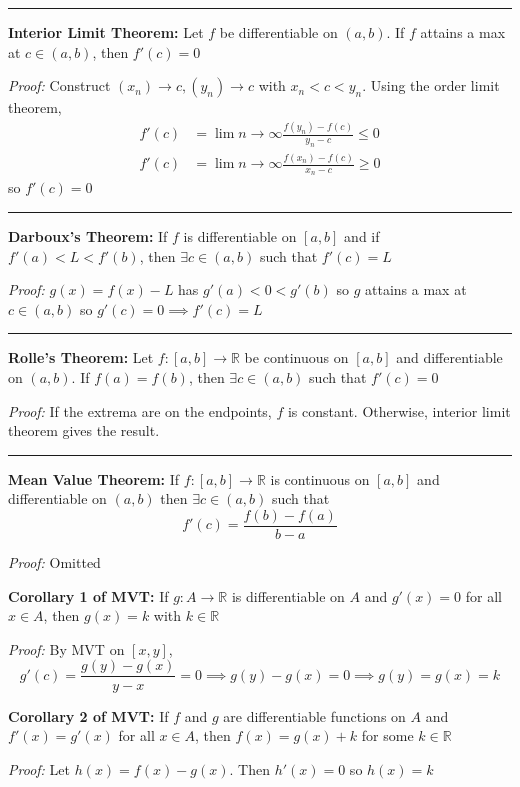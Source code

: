 \documentclass[12pt]{article}
\newcommand{\R}{\mathbb{R}}
\renewcommand{\hline}{\vspace*{10pt} \hrule \vspace*{10pt}}
\begin{document}
    \hline 

    \textbf{Interior Limit Theorem:} Let $f$ be differentiable on $(a, b)$. If $f$ attains a max at $c \in (a, b)$, then $f'(c) = 0$

        \emph{Proof:} Construct $(x_n) \to c, (y_n) \to c$ with $x_n < c < y_n$. Using the order limit theorem,
        \begin{align*}
            f'(c) &= \lim{n \to \infty} \frac{f(y_n) - f(c)}{y_n - c} \leq 0\\ 
            f'(c) &= \lim{n \to \infty} \frac{f(x_n) - f(c)}{x_n - c} \geq 0
        \end{align*}
        so $f'(c) = 0$ 

    \hline 

    \textbf{Darboux's Theorem:} If $f$ is differentiable on $[a, b]$ and if $f'(a) < L < f'(b)$, then $\exists c \in (a, b)$ such that $f'(c) = L$

        \emph{Proof:} $g(x) = f(x) - L$ has $g'(a) < 0 < g'(b)$ so $g$ attains a max at $c \in (a, b)$ so $g'(c) = 0 \implies f'(c) = L$

    \hline

    \textbf{Rolle's Theorem:} Let $f: [a, b] \to \R$ be continuous on $[a, b]$ and differentiable on $(a, b)$. If $f(a) = f(b)$, then $\exists c \in (a, b)$ such that $f'(c) = 0$

        \emph{Proof:} If the extrema are on the endpoints, $f$ is constant. Otherwise, interior limit theorem gives the result. 

    \hline 

    \textbf{Mean Value Theorem:} If $f: [a, b] \to \R$ is continuous on $[a, b]$ and differentiable on $(a, b)$ then $\exists c \in (a, b)$ such that
    \[f'(c) = \frac{f(b) - f(a)}{b - a}\]

        \emph{Proof:} Omitted 


    \textbf{Corollary 1 of MVT:} If $g: A \to \R$ is differentiable on $A$ and $g'(x) = 0$ for all $x \in A$, then $g(x) = k$ with $k \in \R$

        \emph{Proof:} By MVT on $[x, y]$, 
        \[g'(c) = \frac{g(y) - g(x)}{y - x} = 0 \implies g(y) - g(x) = 0 \implies g(y) = g(x) = k\]

    \textbf{Corollary 2 of MVT:} If $f$ and $g$ are differentiable functions on $A$ and $f'(x) = g'(x)$ for all $x \in A$, then $f(x) = g(x) + k$ for some $k \in \R$

        \emph{Proof:} Let $h(x) = f(x) - g(x)$. Then $h'(x) = 0$ so $h(x) = k$
\end{document}
